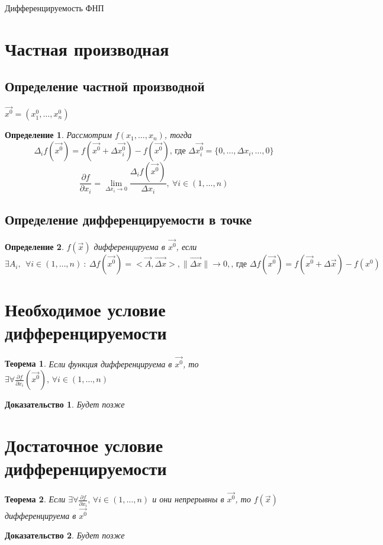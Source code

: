\documentclass[a4paper, 12pt, titlepage, fleqn]{article}
\newtheorem{Def}{Определение}[section]
\newtheorem{Th}{Теорема}[section]
\newtheorem{Proof}{Доказательство}[section]
\newcommand{\T}{\textbf}
\newcommand{\D}{\partial}
\newcommand{\Where}{\T{, где }}
\newcommand{\Indexes}{\T{, }\forall i \in (1, \dots, n)}
\begin{document}
	\begin{Large}
		\begin{center}
			Дифференцируемость ФНП
		\end{center}
	\end{Large}
	\section{Частная производная}
		\subsection{Определение частной производной}
			$\vec{x^0} = \left(x_1^0, \dots, x_n^0\right)$\\
			\begin{Def}
				Рассмотрим $f\left(x_1, \dots, x_n \right) $, тогда 
				\[
					\Delta_i f\left(\vec{x^0}\right) = f \left(\vec{x^0} + \Delta\vec{x_{i}^0}\right) - f \left(\vec{x^0}\right) \Where \Delta\vec{x_{i}^0} = \{0, \dots, \Delta x_i, \dots, 0\}	
				\]
				\[
					\frac{\D f}{\D x_i} = \lim_{\Delta x_i \to 0} \frac{\Delta_i f \left(\vec{x^0}\right)}{\Delta x_i}, \: \forall i \in \left(1, \dots, n\right)
				\]
			\end{Def}
		\subsection{Определение дифференцируемости в точке}
			\begin{Def}
				$f \left(\vec{x}\right)$ дифференцируема в $\vec{x^0}$, если \[
					\exists A_i,\: \: \forall i \in \left(1, \dots, n\right) \: \colon \: \Delta f \left(\vec{x^0}\right) = <\!\!\vec{A}, \vec{\Delta x}\!\!>, \|\vec{\Delta x}\| \to 0, \Where \Delta f \left(\vec{x^0}\right) = f \left(\vec{x^0} + \Delta\vec{x}\right) - f \left(x^0\right) 
				\]
			\end{Def}
	\section{Необходимое условие дифференцируемости}
		\begin{Th}
			Если функция дифференцируема в $\vec{x^0}$, то $\exists \forall \frac{\D f}{\D x_i}\left(\vec{x^0}\right) \Indexes$
		\end{Th}
		\begin{Proof}
			Будет позже
		\end{Proof}
	\section{Достаточное условие дифференцируемости}
		\begin{Th}
			Если $\exists \forall \frac{\D f}{\D x_i} \Indexes$ и они непрерывны в $\vec{x^0}$, то $f \left(\vec{x}\right)$ дифференцируема в $\vec{x^0}$
		\end{Th}
		\begin{Proof}
			Будет позже
		\end{Proof}
\end{document}
